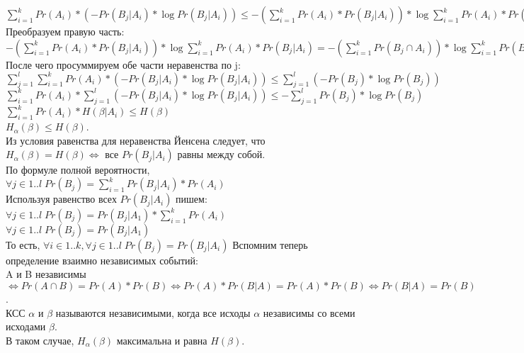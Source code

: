 $\sum\limits_{i = 1}^k Pr(A_i) * (- Pr(B_j | A_i) * \log Pr(B_j | A_i)) \leq -(\sum\limits_{i = 1}^k Pr(A_i) * Pr(B_j | A_i)) * \log \sum\limits_{i = 1}^k Pr(A_i) * Pr(B_j | A_i)$\\
Преобразуем правую часть:\\
$-(\sum\limits_{i = 1}^k Pr(A_i) * Pr(B_j | A_i)) * \log \sum\limits_{i = 1}^k Pr(A_i) * Pr(B_j | A_i) = -(\sum\limits_{i = 1}^k Pr(B_j \cap A_i)) * \log \sum\limits_{i = 1}^k Pr(B_j \cap A_i) = -Pr(B_j) * \log Pr(B_j)$\\
После чего просуммируем обе части неравенства по j:\\
$\sum\limits_{j = 1}^l \sum\limits_{i = 1}^k Pr(A_i) * (- Pr(B_j | A_i) * \log Pr(B_j | A_i)) \leq \sum\limits_{j = 1}^l (-Pr(B_j) * \log Pr(B_j))$\\
$\sum\limits_{i = 1}^k Pr(A_i) * \sum\limits_{j = 1}^l (- Pr(B_j | A_i) * \log Pr(B_j | A_i)) \leq -\sum\limits_{j = 1}^l Pr(B_j) * \log Pr(B_j)$\\
$\sum\limits_{i = 1}^k Pr(A_i) * H(\beta | A_i) \leq H(\beta)$\\
$H_{\alpha}(\beta) \leq H(\beta)$.\\
Из условия равенства для неравенства Йенсена следует, что $H_{\alpha}(\beta) = H(\beta) \Leftrightarrow$ все $Pr(B_j | A_i)$ равны между собой.\\
По формуле полной вероятности,\\
$\forall j \in 1..l \; Pr(B_j) = \sum\limits_{i = 1}^k Pr(B_j | A_i) * Pr(A_i)$\\
Используя равенство всех $Pr(B_j | A_i)$ пишем:\\
$\forall j \in 1..l \; Pr(B_j) = Pr(B_j | A_1) * \sum\limits_{i = 1}^k Pr(A_i)$\\
$\forall j \in 1..l \; Pr(B_j) = Pr(B_j | A_1)$\\
То есть, $\forall i \in 1..k, \forall j \in 1..l \; Pr(B_j) = Pr(B_j | A_i)$
Вспомним теперь определение взаимно независимых событий:\\
A и B независимы $\Leftrightarrow Pr(A \cap B) = Pr(A) * Pr(B) \Leftrightarrow Pr(A) * Pr(B | A) = Pr(A) * Pr(B) \Leftrightarrow Pr(B | A) = Pr(B)$.\\
КСС $\alpha$ и $\beta$ называются независимыми, когда все исходы $\alpha$ независимы со всеми исходами $\beta$.\\
В таком случае, $H_{\alpha}(\beta)$ максимальна и равна $H(\beta)$.
